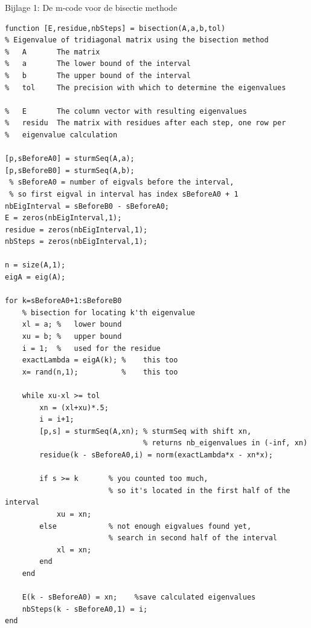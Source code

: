 \documentclass[]{article}
\begin{document}
\pagebreak

Bijlage 1: De m-code voor de bisectie methode 
\begin{framed}
\begin{lstlisting}
function [E,residue,nbSteps] = bisection(A,a,b,tol)
% Eigenvalue of tridiagonal matrix using the bisection method
%   A       The matrix 
%   a       The lower bound of the interval
%   b       The upper bound of the interval
%   tol     The precision with which to determine the eigenvalues

%   E       The column vector with resulting eigenvalues
%   residu  The matrix with residues after each step, one row per
%   eigenvalue calculation

[p,sBeforeA0] = sturmSeq(A,a);
[p,sBeforeB0] = sturmSeq(A,b); 
 % sBeforeA0 = number of eigvals before the interval, 
 % so first eigval in interval has index sBeforeA0 + 1
nbEigInterval = sBeforeB0 - sBeforeA0;
E = zeros(nbEigInterval,1);
residue = zeros(nbEigInterval,1);
nbSteps = zeros(nbEigInterval,1);

n = size(A,1);
eigA = eig(A);

for k=sBeforeA0+1:sBeforeB0
    % bisection for locating k'th eigenvalue
    xl = a; %   lower bound
    xu = b; %   upper bound
    i = 1;  %   used for the residue
    exactLambda = eigA(k); %    this too
    x= rand(n,1);          %    this too
    
    while xu-xl >= tol
        xn = (xl+xu)*.5;
        i = i+1;
        [p,s] = sturmSeq(A,xn); % sturmSeq with shift xn, 
        						% returns nb_eigenvalues in (-inf, xn)
        residue(k - sBeforeA0,i) = norm(exactLambda*x - xn*x);
        
        if s >= k       % you counted too much, 
        				% so it's located in the first half of the interval
            xu = xn;
        else            % not enough eigvalues found yet, 
        				% search in second half of the interval
            xl = xn;
        end
    end
    
    E(k - sBeforeA0) = xn;    %save calculated eigenvalues
    nbSteps(k - sBeforeA0,1) = i;
end
\end{lstlisting}
\label{matlabBisection}
\end{framed}
\end{document}
